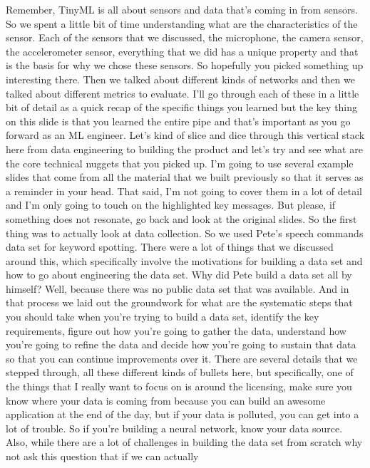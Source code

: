 Remember, TinyML is all about sensors and data that's coming in from sensors.
So we spent a little bit of time understanding
what are the characteristics of the sensor.
Each of the sensors that we discussed, the microphone, the camera
sensor, the accelerometer sensor, everything that we did
has a unique property and that is the basis for why we chose these sensors.
So hopefully you picked something up interesting there.
Then we talked about different kinds of networks
and then we talked about different metrics to evaluate.
I'll go through each of these in a little bit of detail
as a quick recap of the specific things you
learned but the key thing on this slide is that you learned the entire pipe
and that's important as you go forward as an ML engineer.
Let's kind of slice and dice through this vertical
stack here from data engineering to building the product
and let's try and see what are the core technical nuggets that you picked up.
I'm going to use several example slides that come from all the material
that we built previously so that it serves as a reminder in your head.
That said, I'm not going to cover them in a lot of detail
and I'm only going to touch on the highlighted key messages.
But please, if something does not resonate, go back and look
at the original slides.
So the first thing was to actually look at data collection.
So we used Pete's speech commands data set for keyword spotting.
There were a lot of things that we discussed
around this, which specifically involve the motivations for building a data set
and how to go about engineering the data set.
Why did Pete build a data set all by himself?
Well, because there was no public data set that was available.
And in that process we laid out the groundwork
for what are the systematic steps that you should take when you're
trying to build a data set, identify the key requirements,
figure out how you're going to gather the data,
understand how you're going to refine the data
and decide how you're going to sustain that data
so that you can continue improvements over it.
There are several details that we stepped through,
all these different kinds of bullets here,
but specifically, one of the things that I really want to focus on
is around the licensing, make sure you know where your data is coming
from because you can build an awesome application at the end of the day,
but if your data is polluted, you can get into a lot of trouble.
So if you're building a neural network, know your data source.
Also, while there are a lot of challenges in building
the data set from scratch why not ask this question that if we can actually
